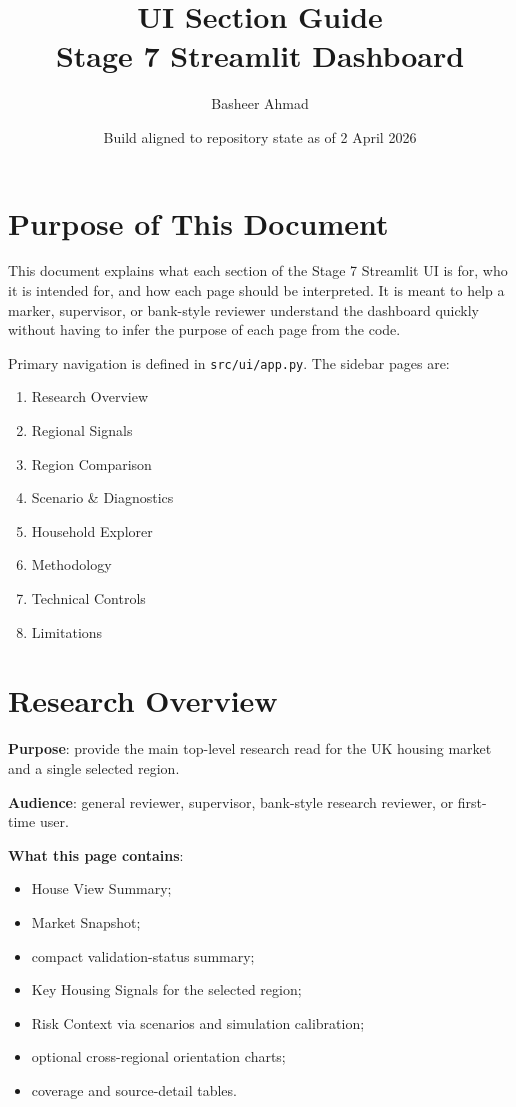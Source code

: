 \documentclass[11pt,a4paper]{article}
\title{\textbf{UI Section Guide}\\
\large Stage 7 Streamlit Dashboard}
\author{Basheer Ahmad}
\date{Build aligned to repository state as of 2 April 2026}
\begin{document}
\maketitle
\tableofcontents
\newpage

\section{Purpose of This Document}

This document explains what each section of the Stage 7 Streamlit UI is for,
who it is intended for, and how each page should be interpreted. It is meant
to help a marker, supervisor, or bank-style reviewer understand the dashboard
quickly without having to infer the purpose of each page from the code.

Primary navigation is defined in \texttt{src/ui/app.py}. The sidebar pages are:

\begin{enumerate}[leftmargin=1.5em]
  \item Research Overview
  \item Regional Signals
  \item Region Comparison
  \item Scenario \& Diagnostics
  \item Household Explorer
  \item Methodology
  \item Technical Controls
  \item Limitations
\end{enumerate}

\section{Research Overview}

\textbf{Purpose}: provide the main top-level research read for the UK housing
market and a single selected region.

\textbf{Audience}: general reviewer, supervisor, bank-style research reviewer,
or first-time user.

\textbf{What this page contains}:
\begin{itemize}[leftmargin=1.5em]
  \item House View Summary;
  \item Market Snapshot;
  \item compact validation-status summary;
  \item Key Housing Signals for the selected region;
  \item Risk Context via scenarios and simulation calibration;
  \item optional cross-regional orientation charts;
  \item coverage and source-detail tables.
\end{itemize}
\end{document}
